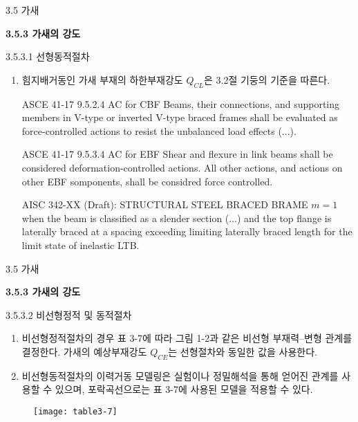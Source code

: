	\begin{frame}{3.5 가새}

	\textbf{3.5.3 가새의 강도}
	
	3.5.3.1 선형동적절차
	
	\begin{enumerate}
		\item[(2)] 힘지배거동인 가새 부재의 하한부재강도 $Q_{CL}$은 3.2절 기둥의 기준을 따른다. 
\begin{block}{ASCE 41-17 9.5.2.4 AC for CBF}
Beams, their connections, and supporting members in V-type or inverted V-type braced frames shall be evaluated as force-controlled actions to resist the unbalanced load effects (...).  
	\end{block}	
	\begin{block}{ASCE 41-17 9.5.3.4 AC for EBF}
Shear and flexure in link beams shall be considered deformation-controlled actions. All other actions, and actions on other EBF somponents, shall be considred force controlled. 
	\end{block}	
	\begin{block}{AISC 342-XX (Draft): STRUCTURAL STEEL BRACED BRAME}
		$m=1$ when the beam is classified as a slender section (...) and the top flange is laterally braced at a spacing exceeding limiting laterally braced length for the limit state of inelastic LTB.
	\end{block}	
	\end{enumerate}
	\end{frame}	
	
	\begin{frame}{3.5 가새}

	\textbf{3.5.3 가새의 강도}
	
	3.5.3.2 비선형정적 및 동적절차
	
	\begin{enumerate}
		\item[(1)] 비선형정적절차의 경우 표 3-7에 따라 그림 1-2과 같은 비선형 부재력--변형 관계를 결정한다. 가새의 예상부재강도 $Q_{CE}$는 선형절차와 동일한 값을 사용한다. 
		\item[(2)] 비선형동적절차의 이력거동 모델링은 실험이나 정밀해석을 통해 얻어진 관계를 사용할 수 있으며, 포락곡선으로는 표 3-7에 사용된 모델을 적용할 수 있다. 
	\end{enumerate}
	\end{frame}	


	\begin{frame}
		\begin{figure}
			\centering
			\texttt{[image: table3-7]}
		\end{figure}
	\end{frame}
		

